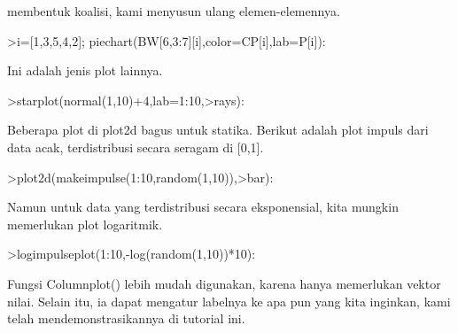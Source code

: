 \documentclass[a4paper,10pt]{article}
\begin{document}
\begin{eulernotebook}
\begin{eulercomment}
\begin{eulercomment}
\begin{eulercomment}
membentuk koalisi, kami menyusun ulang elemen-elemennya.
\end{eulercomment}
\begin{eulerprompt}
>i=[1,3,5,4,2]; piechart(BW[6,3:7][i],color=CP[i],lab=P[i]):
\end{eulerprompt}
\begin{eulercomment}
Ini adalah jenis plot lainnya.
\end{eulercomment}
\begin{eulerprompt}
>starplot(normal(1,10)+4,lab=1:10,>rays):
\end{eulerprompt}
\begin{eulercomment}
Beberapa plot di plot2d bagus untuk statika. Berikut adalah plot
impuls dari data acak, terdistribusi secara seragam di [0,1].
\end{eulercomment}
\begin{eulerprompt}
>plot2d(makeimpulse(1:10,random(1,10)),>bar):
\end{eulerprompt}
\begin{eulercomment}
Namun untuk data yang terdistribusi secara eksponensial, kita mungkin
memerlukan plot logaritmik.
\end{eulercomment}
\begin{eulerprompt}
>logimpulseplot(1:10,-log(random(1,10))*10):
\end{eulerprompt}
\begin{eulercomment}
Fungsi Columnplot() lebih mudah digunakan, karena hanya memerlukan
vektor nilai. Selain itu, ia dapat mengatur labelnya ke apa pun yang
kita inginkan, kami telah mendemonstrasikannya di tutorial ini.


\end{eulercomment}
\end{eulercomment}
\end{eulercomment}
\end{eulernotebook}
\end{document}
